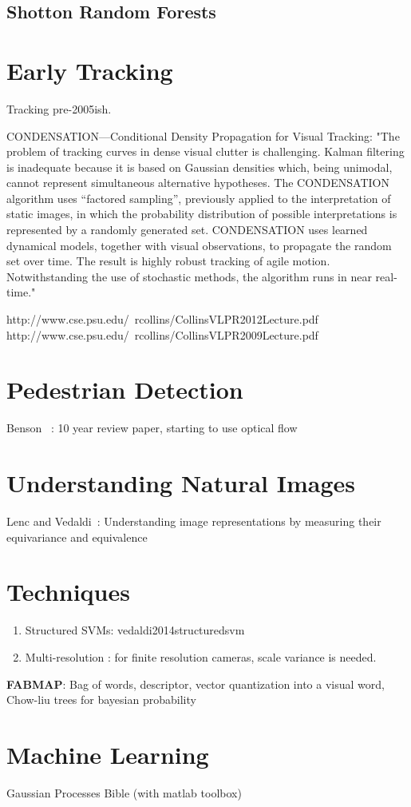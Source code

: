 \subsection{Shotton Random Forests}

\section{Early Tracking}
Tracking pre-2005ish.

CONDENSATION—Conditional Density Propagation for Visual Tracking: "The problem of tracking curves in dense visual clutter is challenging. Kalman filtering is inadequate because it is based on Gaussian densities which, being unimodal, cannot represent simultaneous alternative hypotheses. The CONDENSATION algorithm uses ``factored sampling'', previously applied to the interpretation of static images, in which the probability distribution of possible interpretations is represented by a randomly generated set. CONDENSATION uses learned dynamical models, together with visual observations, to propagate the random set over time. The result is highly robust tracking of agile motion. Notwithstanding the use of stochastic methods, the algorithm runs in near real-time."

http://www.cse.psu.edu/~rcollins/CollinsVLPR2012Lecture.pdf
http://www.cse.psu.edu/~rcollins/CollinsVLPR2009Lecture.pdf

\section{Pedestrian Detection}

Benson \etal~\cite{benenson2014ten}: 10 year review paper, starting to use optical flow

\section{Understanding Natural Images}
Lenc and Vedaldi~\cite{lenc2014understanding}: Understanding image representations by measuring their equivariance and equivalence

\section{Techniques}
\begin{enumerate}
\item Structured SVMs: vedaldi2014structuredsvm
\item Multi-resolution \cite{park2010multiresolution}: for finite resolution cameras, scale variance is needed.
\end{enumerate}

\textbf{FABMAP}:
Bag of words,  descriptor, vector quantization into a visual word, Chow-liu trees for bayesian probability

\section{Machine Learning}
Gaussian Processes Bible (with matlab toolbox) \cite{rasmussen2006gaussian}